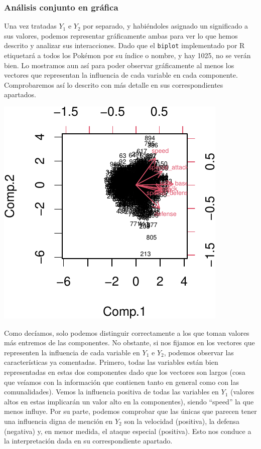 \documentclass[
  12pt,
]{extreport}
\begin{document}
\subsubsection{Análisis conjunto en
gráfica}\label{anuxe1lisis-conjunto-en-gruxe1fica}

Una vez tratadas \(Y_1\) e \(Y_2\) por separado, y habiéndoles asignado
un significado a sus valores, podemos representar gráficamente ambas
para ver lo que hemos descrito y analizar sus interacciones. Dado que el
\texttt{biplot} implementado por R etiquetará a todos los Pokémon por su
índice o nombre, y hay 1025, no se verán bien. Lo mostramos aun así para
poder observar gráficamente al menos los vectores que representan la
influencia de cada variable en cada componente. Comprobaremos así lo
descrito con más detalle en sus correspondientes apartados.

\begin{center}
\includegraphics{trabajo_files/figure-pdf/unnamed-chunk-37-1.pdf}
\end{center}

Como decíamos, solo podemos distinguir correctamente a los que toman
valores más entremos de las componentes. No obstante, si nos fijamos en
los vectores que representen la influencia de cada variable en \(Y_1\) e
\(Y_2\), podemos observar las características ya comentadas. Primero,
todas las variables están bien representadas en estas dos componentes
dado que los vectores son largos (cosa que veíamos con la información
que contienen tanto en general como con las comunalidades). Vemos la
influencia positiva de todas las variables en \(Y_1\) (valores altos en
estas implicarán un valor alto en la componentes), siendo ``speed'' la
que menos influye. Por su parte, podemos comprobar que las únicas que
parecen tener una influencia digna de mención en \(Y_2\) son la
velocidad (positiva), la defensa (negativa) y, en menor medida, el
ataque especial (positiva). Esto nos conduce a la interpretación dada en
su correspondiente apartado.
\end{document}
